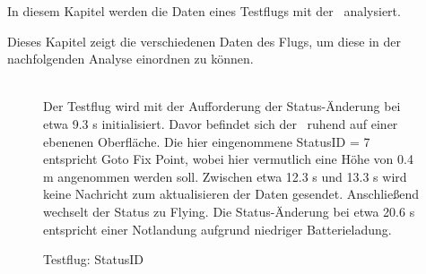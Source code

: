 
In diesem Kapitel werden die Daten eines Testflugs mit der \Ar\ analysiert.






Dieses Kapitel zeigt die verschiedenen Daten des Flugs, um diese in der nachfolgenden Analyse einordnen zu können.



\begin{figure}[ht!]
\vspace{0.25cm}
\begin{center}
\caption{Testflug: StatusID}
\label{fig:FlightStatus}
\end{center}

\vspace{0.25cm}


\missing[override!!]\\
Der Testflug wird mit der Aufforderung der Status-Änderung bei etwa 9.3 s initialisiert. Davor befindet sich der \Quad\ ruhend auf einer ebenenen Oberfläche.
Die hier eingenommene StatusID = 7 entspricht \glq Goto Fix Point\grq, wobei hier vermutlich eine Höhe von 0.4 m angenommen werden soll. Zwischen etwa 12.3 s und 13.3 s wird keine Nachricht zum aktualisieren der Daten gesendet. Anschließend wechselt der Status zu \grq Flying\glq.
Die Status-Änderung bei etwa 20.6 s entspricht einer Notlandung aufgrund niedriger Batterieladung.
\end{figure}


